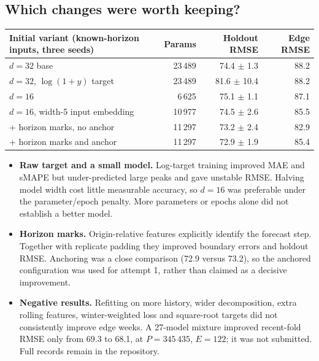 \subsection{Which changes were worth keeping?}
\begin{center}\small
\begin{tabular}{lrrr}
\toprule
Initial variant (known-horizon inputs, three seeds) & Params & Holdout RMSE & Edge RMSE\\
\midrule
$d=32$ base                         & 23\,489 & 74.4 $\pm$ 1.3 & 88.2\\
$d=32$, $\log(1+y)$ target          & 23\,489 & 81.6 $\pm$ 10.4 & 88.2\\
$d=16$                              & 6\,625  & 75.1 $\pm$ 1.1 & 87.1\\
$d=16$, width-5 input embedding     & 10\,977 & 74.5 $\pm$ 2.6 & 85.5\\
\quad + horizon marks, no anchor   & 11\,297 & 73.2 $\pm$ 2.4 & 82.9\\
\quad + horizon marks and anchor   & 11\,297 & 72.9 $\pm$ 1.9 & 85.4\\
\bottomrule
\end{tabular}
\end{center}
\begin{itemize}
  \item \textbf{Raw target and a small model.} Log-target training improved MAE and
        sMAPE but under-predicted large peaks and gave unstable RMSE. Halving model
        width cost little measurable accuracy, so $d=16$ was preferable under the
        parameter/epoch penalty. More parameters or epochs alone did not establish
        a better model.
  \item \textbf{Horizon marks.} Origin-relative features explicitly identify the
        forecast step. Together with replicate padding they improved boundary errors
        and holdout RMSE. Anchoring was a close comparison (72.9 versus 73.2), so the
        anchored configuration was used for attempt 1, rather than claimed as a
        decisive improvement.
  \item \textbf{Negative results.} Refitting on more history, wider decomposition,
        extra rolling features, winter-weighted loss and square-root targets did not
        consistently improve edge weeks. A 27-model mixture improved recent-fold
        RMSE only from 69.3 to 68.1, at $P=345\,435$, $E=122$; it was not submitted.
        Full records remain in the repository.
\end{itemize}

